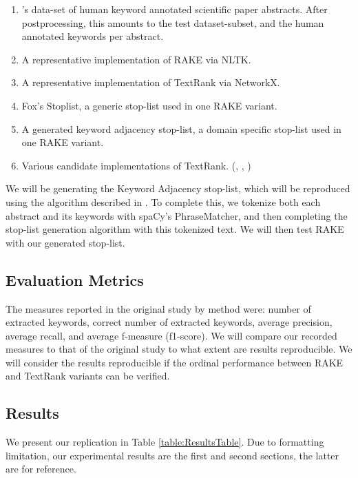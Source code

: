 \documentclass[11pt,a4paper]{article}
\begin{document}
\begin{enumerate}
	\small \itemsep0em 

	\item \citet{hulth-2003-improved}'s data-set of human keyword annotated scientific paper abstracts. After postprocessing, this amounts to the test dataset-subset, and the human annotated keywords per abstract.
	\item A representative implementation of RAKE via NLTK. \citet{2}
	\item A representative implementation of TextRank via NetworkX. \citet{PyTextRank}
	\item Fox's Stoplist, a generic stop-list used in one RAKE variant.
	\item A generated keyword adjacency stop-list, a domain specific stop-list used in one RAKE variant.	
	\item Various candidate implementations of TextRank. (\citet{TextRank-alt1}, \citet{TextRank-alt2}, \citet{TextRank-alt3})

	\normalsize
\end{enumerate}  

We will be generating the Keyword Adjacency stop-list, which will be reproduced using the algorithm described in \citet{1}. To complete this, we tokenize both each abstract and its keywords with spaCy's PhraseMatcher, and then completing the stop-list generation algorithm with this tokenized text. We will then test RAKE with our generated stop-list. 

\subsection{Evaluation Metrics}

The measures reported in the original study by method were: number of extracted keywords, correct number of extracted keywords, average precision, average recall, and average f-measure (f1-score).  We will compare our recorded measures to that of the original study to what extent are  results reproducible. We will consider the results reproducible if the ordinal performance between RAKE and TextRank variants can be verified. 

\subsection{Results}

We present our replication in Table \ref{table:ResultsTable}. Due to formatting limitation, our experimental results are the first and second sections, the latter are for reference.
\end{document}
